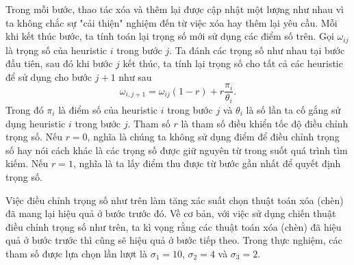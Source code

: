 Trong mỗi bước, thao tác xóa và thêm lại được cập nhật một lượng như nhau vì ta không chắc sự "cải thiện" nghiệm đến từ việc xóa hay thêm lại yêu cầu. Mỗi khi kết thúc bước, ta tính toán lại trọng số mới sử dụng các điểm số trên. Gọi $\omega_{ij}$ là trọng số của heuristic $i$ trong bước $j$. Ta đánh các trọng số như nhau tại bước đầu tiên, sau đó khi bước $j$ kết thúc, ta tính lại trọng số cho tất cả các heuristic để sử dụng cho bước $j+1$ như sau
\begin{equation}
	\label{eq:adaptive_weight}
	\omega_{i, j+1} = \omega_{ij}(1-r)+r\frac{\pi_i}{\theta_i}.
\end{equation}
Trong đó $\pi_i$ là điểm số của heuristic $i$ trong bước $j$ và $\theta_i$ là số lần ta cố gắng sử dụng heuristic $i$ trong bước $j$. Tham số $r$ là tham số điều khiển tốc độ điều chỉnh trọng số. Nếu $r=0$, nghĩa là chúng ta không sử dụng điểm để điều chỉnh trọng số hay nói cách khác là các trọng số được giữ nguyên từ trong suốt quá trình tìm kiếm. Nếu $r=1$, nghĩa là ta lấy điểm thu được từ bước gần nhất để quyết định trọng số.

Việc điều chỉnh trọng số như trên làm tăng xác suất chọn thuật toán xóa (chèn) đã mang lại hiệu quả ở bước trước đó. Về cơ bản, với việc sử dụng chiến thuật điều chỉnh trọng số như trên, ta kì vọng rằng các thuật toán xóa (chèn) đã hiệu quả ở bước trước thì cũng sẽ hiệu quả ở bước tiếp theo. Trong thực nghiệm, các tham số được lựa chọn lần lượt là $\sigma_1=10$, $\sigma_2=4$ và $\sigma_3=2$.

